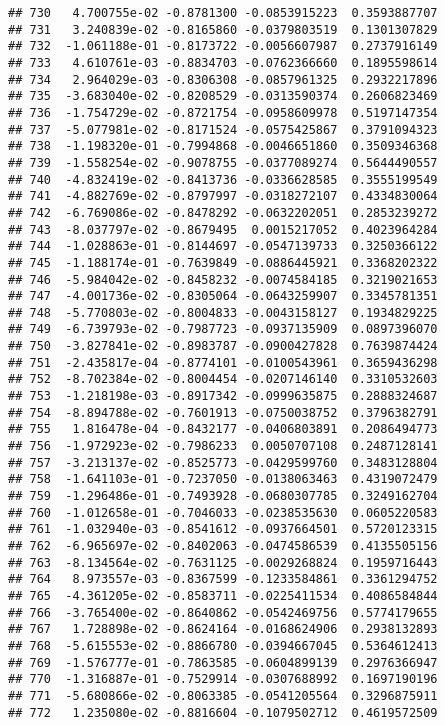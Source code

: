 \documentclass[
]{article}
\begin{document}
\begin{verbatim}
## 730   4.700755e-02 -0.8781300 -0.0853915223  0.3593887707
## 731   3.240839e-02 -0.8165860 -0.0379803519  0.1301307829
## 732  -1.061188e-01 -0.8173722 -0.0056607987  0.2737916149
## 733   4.610761e-03 -0.8834703 -0.0762366660  0.1895598614
## 734   2.964029e-03 -0.8306308 -0.0857961325  0.2932217896
## 735  -3.683040e-02 -0.8208529 -0.0313590374  0.2606823469
## 736  -1.754729e-02 -0.8721754 -0.0958609978  0.5197147354
## 737  -5.077981e-02 -0.8171524 -0.0575425867  0.3791094323
## 738  -1.198320e-01 -0.7994868 -0.0046651860  0.3509346368
## 739  -1.558254e-02 -0.9078755 -0.0377089274  0.5644490557
## 740  -4.832419e-02 -0.8413736 -0.0336628585  0.3555199549
## 741  -4.882769e-02 -0.8797997 -0.0318272107  0.4334830064
## 742  -6.769086e-02 -0.8478292 -0.0632202051  0.2853239272
## 743  -8.037797e-02 -0.8679495  0.0015217052  0.4023964284
## 744  -1.028863e-01 -0.8144697 -0.0547139733  0.3250366122
## 745  -1.188174e-01 -0.7639849 -0.0886445921  0.3368202322
## 746  -5.984042e-02 -0.8458232 -0.0074584185  0.3219021653
## 747  -4.001736e-02 -0.8305064 -0.0643259907  0.3345781351
## 748  -5.770803e-02 -0.8004833 -0.0043158127  0.1934829225
## 749  -6.739793e-02 -0.7987723 -0.0937135909  0.0897396070
## 750  -3.827841e-02 -0.8983787 -0.0900427828  0.7639874424
## 751  -2.435817e-04 -0.8774101 -0.0100543961  0.3659436298
## 752  -8.702384e-02 -0.8004454 -0.0207146140  0.3310532603
## 753  -1.218198e-03 -0.8917342 -0.0999635875  0.2888324687
## 754  -8.894788e-02 -0.7601913 -0.0750038752  0.3796382791
## 755   1.816478e-04 -0.8432177 -0.0406803891  0.2086494773
## 756  -1.972923e-02 -0.7986233  0.0050707108  0.2487128141
## 757  -3.213137e-02 -0.8525773 -0.0429599760  0.3483128804
## 758  -1.641103e-01 -0.7237050 -0.0138063463  0.4319072479
## 759  -1.296486e-01 -0.7493928 -0.0680307785  0.3249162704
## 760  -1.012658e-01 -0.7046033 -0.0238535630  0.0605220583
## 761  -1.032940e-03 -0.8541612 -0.0937664501  0.5720123315
## 762  -6.965697e-02 -0.8402063 -0.0474586539  0.4135505156
## 763  -8.134564e-02 -0.7631125 -0.0029268824  0.1959716443
## 764   8.973557e-03 -0.8367599 -0.1233584861  0.3361294752
## 765  -4.361205e-02 -0.8583711 -0.0225411534  0.4086584844
## 766  -3.765400e-02 -0.8640862 -0.0542469756  0.5774179655
## 767   1.728898e-02 -0.8624164 -0.0168624906  0.2938132893
## 768  -5.615553e-02 -0.8866780 -0.0394667045  0.5364612413
## 769  -1.576777e-01 -0.7863585 -0.0604899139  0.2976366947
## 770  -1.316887e-01 -0.7529914 -0.0307688992  0.1697190196
## 771  -5.680866e-02 -0.8063385 -0.0541205564  0.3296875911
## 772   1.235080e-02 -0.8816604 -0.1079502712  0.4619572509

\end{verbatim}
\end{document}
